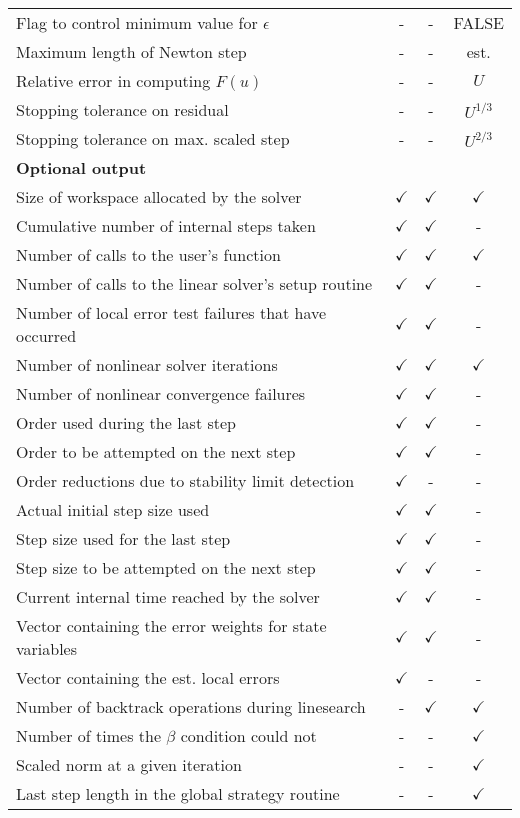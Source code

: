 \begin{table}[tp]
\begin{tabular}{|p{2.75in}|c|c|c|}
Flag to control minimum value for $\epsilon$ & - & - & FALSE \\
Maximum length of Newton step & - & - & est. \\
Relative error in computing $F(u)$ & - & - & $U$ \\
Stopping tolerance on residual & - & - & $U^{1/3}$ \\
Stopping tolerance on max. scaled step & - & - & $U^{2/3}$ \\
\hline
\hline
{\bf Optional output} &  &  & \\
\hline
Size of workspace allocated by the solver & $\checkmark$ & $\checkmark$ & $\checkmark$ \\
Cumulative number of internal steps taken & $\checkmark$ & $\checkmark$ & - \\
Number of calls to the user's function & $\checkmark$ & $\checkmark$ & $\checkmark$ \\
Number of calls to the linear solver's setup routine & $\checkmark$ & $\checkmark$ & - \\
Number of local error test failures that have occurred & $\checkmark$ & $\checkmark$ & - \\
Number of nonlinear solver iterations & $\checkmark$ & $\checkmark$ & $\checkmark$ \\
Number of nonlinear convergence failures & $\checkmark$ & $\checkmark$ & - \\
Order used during the last step & $\checkmark$ & $\checkmark$ & - \\
Order to be attempted on the next step & $\checkmark$ & $\checkmark$ & - \\
Order reductions due to stability limit detection & $\checkmark$ & - & - \\
Actual initial step size used & $\checkmark$ & $\checkmark$ & - \\
Step size used for the last step & $\checkmark$ & $\checkmark$ & - \\
Step size to be attempted on the next step & $\checkmark$ & $\checkmark$ & - \\
Current internal time reached by the solver & $\checkmark$ & $\checkmark$ & - \\
Vector containing the error weights for state variables & $\checkmark$ & $\checkmark$ & - \\
Vector containing the est. local errors & $\checkmark$ & - & - \\
Number of backtrack operations during linesearch & - & $\checkmark$ & $\checkmark$ \\
Number of times the $\beta$ condition could not & - & - & $\checkmark$ \\
Scaled norm at a given iteration & - & - & $\checkmark$ \\
Last step length in the global strategy routine & - & - & $\checkmark$ \\
\hline
\end{tabular}
\end{table}

